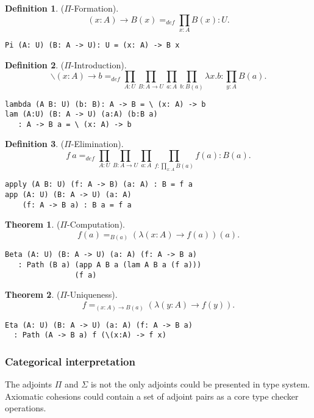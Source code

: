 \documentclass{article}
\theoremstyle{definition}
\newtheorem{theorem}{Theorem}
\newtheorem{definition}{Definition}
\begin{document}
\begin{definition} ($\Pi$-Formation).
$$(x: A) \rightarrow B(x) =_{def} \prod_{x:A}B(x) : U.$$
\begin{lstlisting}
Pi (A: U) (B: A -> U): U = (x: A) -> B x
\end{lstlisting}
\end{definition}

\begin{definition} ($\Pi$-Introduction).
$$\backslash (x: A) \rightarrow b =_{def} \prod_{A:U}\prod_{B:A \rightarrow U}\prod_{a: A}\prod_{b:B(a)}\lambda x.b : \prod_{y:A}B(a).$$
\begin{lstlisting}
lambda (A B: U) (b: B): A -> B = \ (x: A) -> b
lam (A:U) (B: A -> U) (a:A) (b:B a)
   : A -> B a = \ (x: A) -> b
\end{lstlisting}
\end{definition}

\begin{definition} ($\Pi$-Elimination).
$$f\ a =_{def} \prod_{A:U}\prod_{B: A \rightarrow U}\prod_{a:A}\prod_{f: \prod_{x:A}B(a)}f(a) : B(a).$$
\begin{lstlisting}
apply (A B: U) (f: A -> B) (a: A) : B = f a
app (A: U) (B: A -> U) (a: A)
    (f: A -> B a) : B a = f a
\end{lstlisting}
\end{definition}

\begin{theorem} ($\Pi$-Computation).
$$f(a) =_{B(a)} (\lambda (x:A) \rightarrow f(a))(a).$$
\begin{lstlisting}
Beta (A: U) (B: A -> U) (a: A) (f: A -> B a)
   : Path (B a) (app A B a (lam A B a (f a)))
                (f a)
\end{lstlisting}
\end{theorem}

\begin{theorem} ($\Pi$-Uniqueness).
$$f =_{(x:A)\rightarrow B(a)} (\lambda (y:A) \rightarrow f(y)).$$
\begin{lstlisting}
Eta (A: U) (B: A -> U) (a: A) (f: A -> B a)
  : Path (A -> B a) f (\(x:A) -> f x)
\end{lstlisting}
\end{theorem}

\subsubsection*{Categorical interpretation}

The adjoints $\Pi$ and $\Sigma$ is not the only adjoints could be presented in type system.
Axiomatic cohesions could contain a set of adjoint pairs as a core type checker operations.
\end{document}
